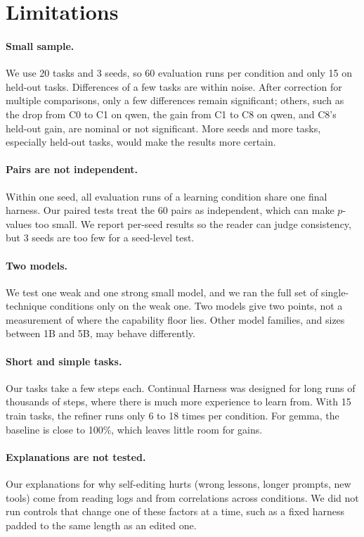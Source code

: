 \section{Limitations}
\label{sec:limitations}

\paragraph{Small sample.}
We use 20 tasks and 3 seeds, so 60 evaluation runs per condition and only 15 on held-out tasks.
Differences of a few tasks are within noise. After correction for multiple comparisons, only a few
differences remain significant; others, such as the drop from C0 to C1 on qwen, the gain from C1 to
C8 on qwen, and C8's held-out gain, are nominal or not significant. More seeds and more tasks,
especially held-out tasks, would make the results more certain.

\paragraph{Pairs are not independent.}
Within one seed, all evaluation runs of a learning condition share one final harness. Our paired
tests treat the 60 pairs as independent, which can make $p$-values too small. We report per-seed
results so the reader can judge consistency, but 3 seeds are too few for a seed-level test.

\paragraph{Two models.}
We test one weak and one strong small model, and we ran the full set of single-technique conditions
only on the weak one. Two models give two points, not a measurement of where the capability floor
lies. Other model families, and sizes between 1B and 5B, may behave differently.

\paragraph{Short and simple tasks.}
Our tasks take a few steps each. Continual Harness was designed for long runs of thousands of steps,
where there is much more experience to learn from. With 15 train tasks, the refiner runs only 6 to 18
times per condition. For gemma, the baseline is close to 100\%, which leaves little room for gains.

\paragraph{Explanations are not tested.}
Our explanations for why self-editing hurts (wrong lessons, longer prompts, new tools) come from
reading logs and from correlations across conditions. We did not run controls that change one of
these factors at a time, such as a fixed harness padded to the same length as an edited one.

